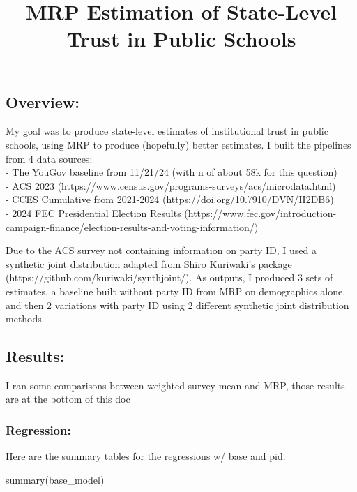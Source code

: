 \documentclass[
  letterpaper,
  DIV=11,
  numbers=noendperiod]{scrartcl}
\title{MRP Estimation of State-Level Trust in Public Schools}
\author{}
\date{}
\newenvironment{Shaded}{\begin{snugshade}}{\end{snugshade}}
\newcommand{\FunctionTok}[1]{\textcolor[rgb]{0.28,0.35,0.67}{#1}}
\newcommand{\NormalTok}[1]{\textcolor[rgb]{0.00,0.23,0.31}{#1}}
\begin{document}
\maketitle


\subsection{Overview:}\label{overview}

My goal was to produce state-level estimates of institutional trust in
public schools, using MRP to produce (hopefully) better estimates. I
built the pipelines from 4 data sources:\\
- The YouGov baseline from 11/21/24 (with n of about 58k for this
question)\\
- ACS 2023
(https://www.census.gov/programs-surveys/acs/microdata.html)\\
- CCES Cumulative from 2021-2024 (https://doi.org/10.7910/DVN/II2DB6)\\
- 2024 FEC Presidential Election Results
(https://www.fec.gov/introduction-campaign-finance/election-results-and-voting-information/)

Due to the ACS survey not containing information on party ID, I used a
synthetic joint distribution adapted from Shiro Kuriwaki's package
(https://github.com/kuriwaki/synthjoint/). As outputs, I produced 3 sets
of estimates, a baseline built without party ID from MRP on demographics
alone, and then 2 variations with party ID using 2 different synthetic
joint distribution methods.

\subsection{Results:}\label{results}

I ran some comparisons between weighted survey mean and MRP, those
results are at the bottom of this doc

\subsubsection{Regression:}\label{regression}

Here are the summary tables for the regressions w/ base and pid.

\begin{Shaded}
\begin{Highlighting}[]
\FunctionTok{summary}\NormalTok{(base\_model)}
\end{Highlighting}
\end{Shaded}
\end{document}
